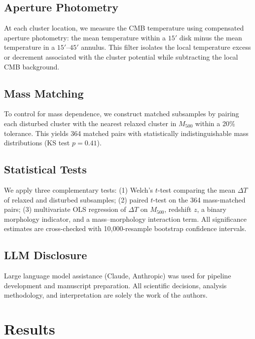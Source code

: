 \documentclass[twocolumn]{article}
\begin{document}
\subsection{Aperture Photometry}

At each cluster location, we measure the CMB temperature using
compensated aperture photometry: the mean temperature within a
$15'$ disk minus the mean temperature in a $15'$--$45'$ annulus.
This filter isolates the local temperature excess or decrement
associated with the cluster potential while subtracting the local
CMB background.

\subsection{Mass Matching}

To control for mass dependence, we construct matched subsamples by
pairing each disturbed cluster with the nearest relaxed cluster in
$M_{500}$ within a 20\% tolerance.
This yields 364 matched pairs with statistically indistinguishable
mass distributions (KS test $p = 0.41$).

\subsection{Statistical Tests}

We apply three complementary tests:
(1) Welch's $t$-test comparing the mean $\Delta T$ of relaxed and
disturbed subsamples;
(2) paired $t$-test on the 364 mass-matched pairs;
(3) multivariate OLS regression of $\Delta T$ on $M_{500}$,
redshift $z$, a binary morphology indicator, and a mass--morphology
interaction term.
All significance estimates are cross-checked with 10,000-resample
bootstrap confidence intervals.

\subsection{LLM Disclosure}

Large language model assistance (Claude, Anthropic) was used for
pipeline development and manuscript preparation.
All scientific decisions, analysis methodology, and interpretation
are solely the work of the authors.

\section{Results}
\label{sec:results}
\end{document}
